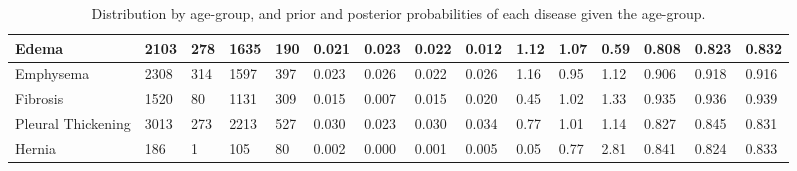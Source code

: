 \documentclass[12pt,oneside,a4paper]{report}
\begin{document}
\begin{landscape}
\begin{table}
\begin{tabular}{@{}lllllllllllllll@{}}
Edema              & 2103  & 278      & 1635          & 190      & 0.021 & 0.023    & 0.022         & 0.012    & 1.12     & 1.07          & 0.59     & 0.808    & 0.823         & 0.832    \\ \midrule
Emphysema          & 2308  & 314      & 1597          & 397      & 0.023 & 0.026    & 0.022         & 0.026    & 1.16     & 0.95          & 1.12     & 0.906    & 0.918         & 0.916    \\ \midrule
Fibrosis           & 1520  & 80       & 1131          & 309      & 0.015 & 0.007    & 0.015         & 0.020    & 0.45     & 1.02          & 1.33     & 0.935    & 0.936         & 0.939    \\ \midrule
Pleural Thickening & 3013  & 273      & 2213          & 527      & 0.030 & 0.023    & 0.030         & 0.034    & 0.77     & 1.01          & 1.14     & 0.827    & 0.845         & 0.831    \\ \midrule
Hernia             & 186   & 1        & 105           & 80       & 0.002 & 0.000    & 0.001         & 0.005    & 0.05     & 0.77          & 2.81     & 0.841    & 0.824         & 0.833    \\
\bottomrule
\end{tabular}
\caption{Distribution by age-group, and prior and posterior probabilities of each disease given the age-group.}
\label{tab:age_bias}
\end{table}
\end{landscape}
\end{document}
